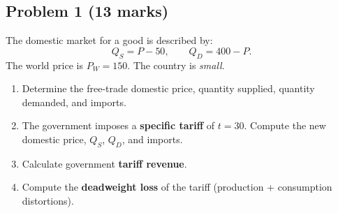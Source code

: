 \documentclass[12pt]{article}
\begin{document}
\vspace{1em}

\vspace{1em}



\subsection*{Problem 1 (13 marks)}

The domestic market for a good is described by:
\[
Q_S = P - 50, \qquad Q_D = 400 - P.
\]
The world price is \( P_W = 150 \).  
The country is \textit{small}.

\begin{enumerate}[label=(\arabic*)]
\item Determine the free-trade domestic price, quantity supplied, quantity demanded, and imports.
\item The government imposes a \textbf{specific tariff} of \( t = 30 \).  
Compute the new domestic price, \( Q_S \), \( Q_D \), and imports.
\item Calculate government \textbf{tariff revenue}.
\item Compute the \textbf{deadweight loss} of the tariff (production + consumption distortions).
\end{enumerate}
\end{document}
